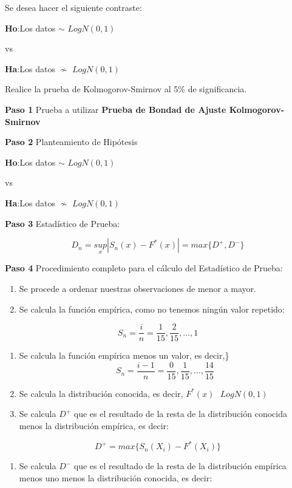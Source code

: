 \documentclass[a4paper,oneside,openany]{book}
\providecommand{\tightlist}{%
  \setlength{\itemsep}{0pt}\setlength{\parskip}{0pt}}
\begin{document}
Se desea hacer el siguiente contraste:

\textbf{Ho}:Los datos \(\sim\) \(LogN(0,1)\)

vs

\textbf{Ha}:Los datos \(\nsim\) \(LogN(0,1)\)

Realice la prueba de Kolmogorov-Smirnov al 5\% de significancia.

\textbf{Paso 1} Prueba a utilizar \textbf{Prueba de Bondad de Ajuste
Kolmogorov-Smirnov}

\textbf{Paso 2} Planteamiento de Hipótesis

\textbf{Ho}:Los datos \(\sim\) \(LogN(0,1)\)

vs

\textbf{Ha}:Los datos \(\nsim\) \(LogN(0,1)\)

\textbf{Paso 3} Estadístico de Prueba:

\[D_{n}=\underset{x}{sup}|S_{n}(x)-F^*(x)|=max\{ D^+,D^-\}\]

\textbf{Paso 4} Procedimiento completo para el cálculo del Estadístico
de Prueba:

\begin{enumerate}
\def\labelenumi{\arabic{enumi})}
\item
  Se procede a ordenar nuestras observaciones de menor a mayor.
\item
  Se calcula la función empírica, como no tenemos ningún valor repetido:
\end{enumerate}

\[S_{n}= \frac{i}{n}=\frac{1}{15},\frac{2}{15}, \ldots, 1\]

\begin{enumerate}
\def\labelenumi{\arabic{enumi})}
\setcounter{enumi}{2}
\item
  Se calcula la función empírica menos un valor, es decir,\}
  \[S_{n}= \frac{i-1}{n}=\frac{0}{15},\frac{1}{15}, \ldots, \frac{14}{15}\]
\item
  Se calcula la distribución conocida, es decir,
  \(F^*(x) \ \ \  LogN(0,1)\)
\item
  Se calcula \(D^+\) que es el resultado de la resta de la distribución
  conocida menos la distribución empírica, es decir:
\end{enumerate}

\[D^+= max \{ S_{n}(X_{i})-F^*(X_{i})\}\]

\begin{enumerate}
\def\labelenumi{\arabic{enumi})}
\setcounter{enumi}{5}
\tightlist
\item
  Se calcula \(D^-\) que es el resultado de la resta de la distribución
  empírica menos uno menos la distribución conocida, es decir:
\end{enumerate}
\end{document}
